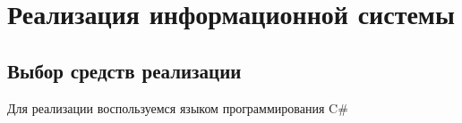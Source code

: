 \section{Реализация информационной системы}
\subsection{Выбор средств реализации}
Для реализации воспользуемся языком программирования C\#

\pagebreak